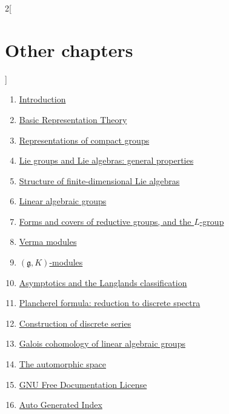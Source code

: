 \begin{multicols}{2}[\section{Other chapters}]
\noindent
\begin{enumerate}
\item \hyperref[introduction-section-phantom]{Introduction}
\item \hyperref[representationtheory-section-phantom]{Basic Representation Theory}
\item \hyperref[representations-compact-section-phantom]{Representations of compact groups}
\item \hyperref[liegroups-general-section-phantom]{Lie groups and Lie algebras: general properties}
\item \hyperref[liestructure-section-phantom]{Structure of finite-dimensional Lie algebras}
\item \hyperref[algebraicgroups-section-phantom]{Linear algebraic groups}
\item \hyperref[reductiveforms-section-phantom]{Forms and covers of reductive groups, and the $L$-group}
\item \hyperref[vermamodules-section-phantom]{Verma modules}
\item \hyperref[gKmodules-section-phantom]{$(\mathfrak g, K)$-modules}
\item \hyperref[asymptotics-section-phantom]{Asymptotics and the Langlands classification}
\item \hyperref[plancherel-section-phantom]{Plancherel formula: reduction to discrete spectra}
\item \hyperref[discreteseries-section-phantom]{Construction of discrete series}
\item \hyperref[galoiscohomology-section-phantom]{Galois cohomology of linear algebraic groups}
\item \hyperref[automorphicspace-section-phantom]{The automorphic space}
\item \hyperref[fdl-section-phantom]{GNU Free Documentation License}
\item \hyperref[index-section-phantom]{Auto Generated Index}
\end{enumerate}
\end{multicols}



